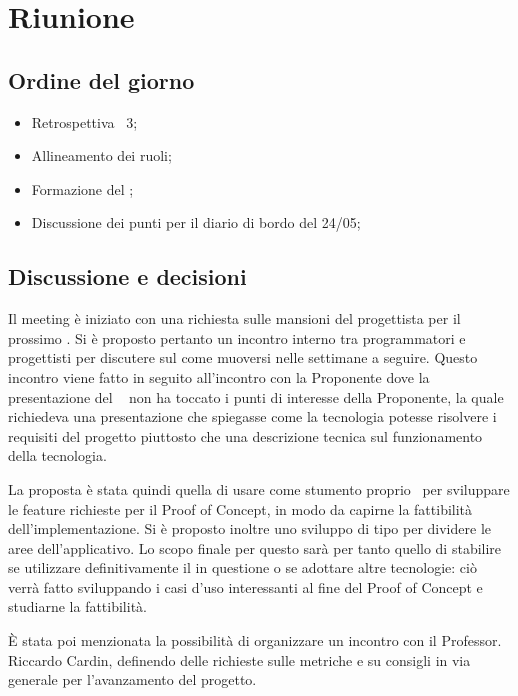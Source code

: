 \section{Riunione}
\subsection{Ordine del giorno}
\begin{itemize}
	\item Retrospettiva \ 3;
	\item Allineamento dei ruoli;
	\item Formazione del ;
	\item Discussione dei punti per il diario di bordo del 24/05;
\end{itemize}

\subsection{Discussione e decisioni}
\par Il meeting è iniziato con una richiesta sulle mansioni del progettista per il prossimo . 
Si è proposto pertanto un incontro interno tra programmatori e progettisti per discutere sul come muoversi nelle settimane a seguire. 
Questo incontro viene fatto in seguito all'incontro con la Proponente dove la presentazione del \  non ha toccato i punti di interesse della Proponente, la quale richiedeva una presentazione che spiegasse come la tecnologia potesse risolvere i requisiti del progetto piuttosto che una descrizione tecnica sul funzionamento della tecnologia.
\par La proposta è stata quindi quella di usare come stumento proprio \ per sviluppare le feature richieste per il Proof of Concept, in modo da capirne la fattibilità dell'implementazione. 
Si è proposto inoltre uno sviluppo di tipo  per dividere le aree dell'applicativo. 
Lo scopo finale per questo  sarà per tanto quello di stabilire se utilizzare definitivamente il  in questione o se adottare altre tecnologie: ciò verrà fatto sviluppando i casi d'uso interessanti al fine del Proof of Concept e studiarne la fattibilità.
\par È stata poi menzionata la possibilità di organizzare un incontro con il Professor. Riccardo Cardin, definendo delle richieste sulle metriche e su consigli in via generale per l'avanzamento del progetto. 
